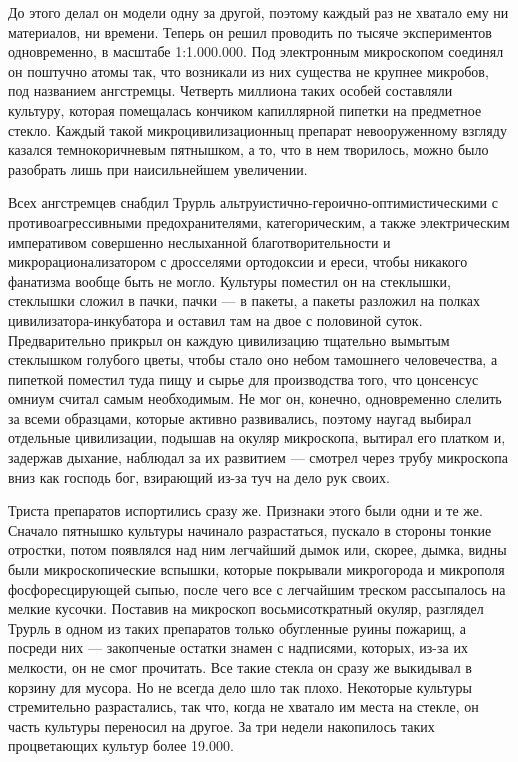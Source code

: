 До этого делал он модели одну за другой, поэтому каждый
раз не хватало ему ни материалов, ни времени. Теперь он
решил проводить по тысяче экспериментов одновременно, в
масштабе 1:1.000.000. Под электронным микроскопом соединял
он поштучно атомы так, что возникали из них существа не
крупнее микробов, под названием ангстремцы. Четверть
миллиона таких особей составляли культуру, которая
помещалась кончиком капиллярной пипетки на предметное
стекло. Каждый такой микроцивилизационныц препарат
невооруженному взгляду казался темнокоричневым пятнышком, а
то, что в нем творилось, можно было разобрать лишь при
наисильнейшем увеличении.

Всех ангстремцев снабдил Трурль
альтруистично-героично-оптимистическими с
противоагрессивными предохранителями, категорическим, а
также электрическим императивом совершенно неслыханной
благотворительности и микрорационализатором с дросселями
ортодоксии и ереси, чтобы никакого фанатизма вообще быть не
могло. Культуры поместил он на стеклышки, стеклышки сложил в
пачки, пачки --- в пакеты, а пакеты разложил на полках
цивилизатора-инкубатора и оставил там на двое с половиной
суток. Предварительно прикрыл он каждую цивилизацию
тщательно вымытым стеклышком голубого цветы, чтобы стало оно
небом тамошнего человечества, а пипеткой поместил туда пищу
и сырье для производства того, что цонсенсус омниум считал
самым необходимым. Не мог он, конечно, одновременно слелить
за всеми образцами, которые активно развивались, поэтому
наугад выбирал отдельные цивилизации, подышав на окуляр
микроскопа, вытирал его платком и, задержав дыхание,
наблюдал за их развитием --- смотрел через трубу микроскопа
вниз как господь бог, взирающий из-за туч на дело рук своих.

Триста препаратов испортились сразу же. Признаки этого
были одни и те же. Сначало пятнышко культуры начинало
разрастаться, пускало в стороны тонкие отростки, потом
появлялся над ним легчайший дымок или, скорее, дымка, видны
были микроскопические вспышки, которые покрывали микрогорода
и микрополя фосфоресцирующей сыпью, после чего все с
легчайшим треском рассыпалось на мелкие кусочки. Поставив на
микроскоп восьмисоткратный окуляр, разглядел Трурль в одном
из таких препаратов только обугленные руины пожарищ, а
посреди них --- закопченые остатки знамен с надписями,
которых, из-за их мелкости, он не смог прочитать. Все такие
стекла он сразу же выкидывал в корзину для мусора. Но не
всегда дело шло так плохо. Некоторые культуры стремительно
разрастались, так что, когда не хватало им места на стекле,
он часть культуры переносил на другое. За три недели
накопилось таких процветающих культур более 19.000.

